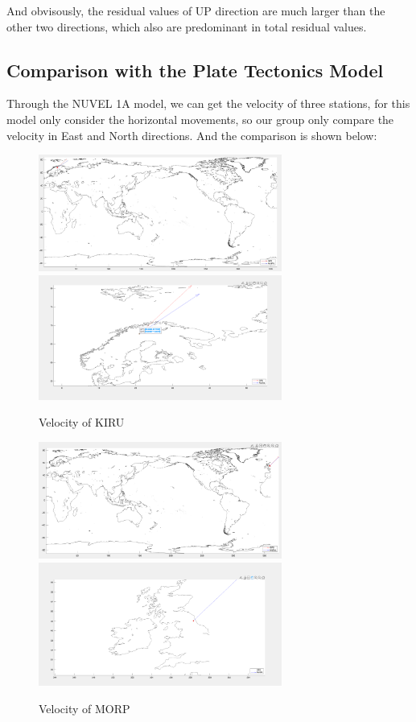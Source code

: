 \documentclass{article}
\begin{document}
And obvisously, the residual values of UP direction are much larger than the other two directions, which also are predominant in total residual values.


\subsection{Comparison with the Plate Tectonics Model}
Through the NUVEL 1A model, we can get the velocity of three stations, for this model only consider the horizontal movements,
so our group only compare the velocity in East and North directions. And the comparison is shown below:
\begin{figure}[H]
  \centering
  {
  \includegraphics[width=8cm]{../result/KIRU/KIRU_4.jpg}}
  \hspace{3pt}    
  {
  \includegraphics[width=8cm]{../result/KIRU/KIRU_4(zoom_up).jpg}}
  \caption{Velocity of KIRU}
  \label{fig:Vel_KIRU}
  \end{figure}
  \begin{figure}[H]
    \centering
    {
    \includegraphics[width=8cm]{../result/MORP/MORP_4.jpg}}
    \hspace{3pt}    
    {
    \includegraphics[width=8cm]{../result/MORP/MORP_4(zoom_up).jpg}}
    \caption{Velocity of MORP}
    \label{fig:Vel_MORP}
    \end{figure}
\end{document}
